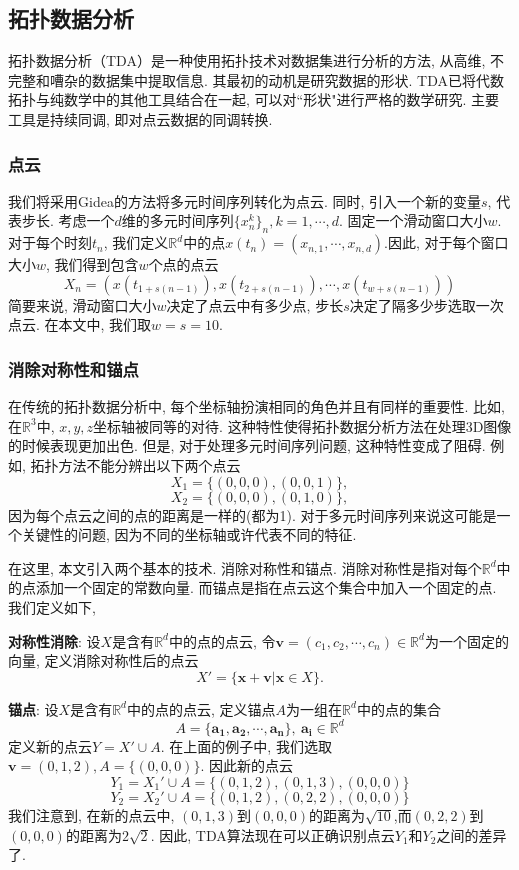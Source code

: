 \documentclass[12pt]{ctexart}
\begin{document}
\subsection{拓扑数据分析}\label{lb3}
拓扑数据分析（TDA）是一种使用拓扑技术对数据集进行分析的方法, 从高维, 不完整和嘈杂的数据集中提取信息. 其最初的动机是研究数据的形状. TDA已将代数拓扑与纯数学中的其他工具结合在一起, 可以对``形状"进行严格的数学研究. 主要工具是持续同调, 即对点云数据的同调转换.

\subsubsection{点云}

我们将采用Gidea\cite{ref25}的方法将多元时间序列转化为点云. 同时, 引入一个新的变量$s$, 代表步长. 考虑一个$d$维的多元时间序列$\{x_{n}^{k}\}_{n}, k=1,\cdots, d$. 固定一个滑动窗口大小$w$.对于每个时刻$t_{n}$, 我们定义$\mathbb{R}^{d}$中的点$x(t_{n})=(x_{n,1},\cdots,x_{n,d})$.因此, 对于每个窗口大小$w$, 我们得到包含$w$个点的点云
$$X_{n}=(x(t_{1+s(n-1)}),x(t_{2+s(n-1)}),\cdots,x(t_{w+s(n-1)}))$$
简要来说, 滑动窗口大小$w$决定了点云中有多少点, 步长$s$决定了隔多少步选取一次点云. 在本文中, 我们取$w=s=10$.
\subsubsection{消除对称性和锚点}
在传统的拓扑数据分析中, 每个坐标轴扮演相同的角色并且有同样的重要性. 比如, 在$\mathbb{R}^{3}$中, $x, y, z$坐标轴被同等的对待. 这种特性使得拓扑数据分析方法在处理3D图像的时候表现更加出色. 但是, 对于处理多元时间序列问题, 这种特性变成了阻碍. 例如, 拓扑方法不能分辨出以下两个点云
$$X_{1}=\{(0,0,0),(0,0,1)\},$$
$$X_{2}=\{(0,0,0),(0,1,0)\},$$
因为每个点云之间的点的距离是一样的(都为1). 对于多元时间序列来说这可能是一个关键性的问题, 因为不同的坐标轴或许代表不同的特征. 

在这里, 本文引入两个基本的技术. 消除对称性和锚点. 消除对称性是指对每个$\mathbb{R}^{d}$中的点添加一个固定的常数向量. 而锚点是指在点云这个集合中加入一个固定的点. 我们定义如下,

\textbf{对称性消除}: 设$X$是含有$\mathbb{R}^{d}$中的点的点云, 令$\bm{v}=(c_{1},c_{2},\cdots,c_{n})\in \mathbb{R}^{d}$为一个固定的向量, 定义消除对称性后的点云
$$X'=\{\bm{x}+\bm{v}|\bm{x}\in X \}.$$

\textbf{锚点}: 设$X$是含有$\mathbb{R}^{d}$中的点的点云, 定义锚点$A$为一组在$\mathbb{R}^{d}$中的点的集合
$$A=\{\bm{a_{1}},\bm{a_{2}},\cdots,\bm{a_{n}}\},\ \bm{a_{i}}\in \mathbb{R}^{d}$$
定义新的点云$Y=X'\cup A$. 在上面的例子中, 我们选取
$\bm{v}=(0,1,2), A=\{(0,0,0)\}$. 因此新的点云
$$Y_{1}=X_{1}'\cup A=\{(0,1,2),(0,1,3),(0,0,0)\}$$
$$Y_{2}=X_{2}'\cup A=\{(0,1,2),(0,2,2),(0,0,0)\}$$
我们注意到, 在新的点云中, $(0,1,3)$到$(0,0,0)$的距离为$\sqrt{10}$,而$(0,2,2)$到$(0,0,0)$的距离为$2\sqrt{2}$. 因此, TDA算法现在可以正确识别点云$Y_{1}$和$Y_{2}$之间的差异了.
\end{document}
